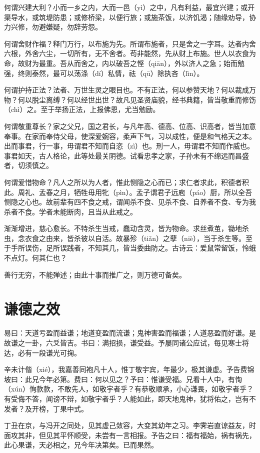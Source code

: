 \documentclass[12pt,UTF8]{ctexbook}
\begin{document}
何谓兴建大利？小而一乡之内，大而一邑（yì）之中，凡有利益，最宜兴建；或开渠导水，或筑堤防患；或修桥梁，以便行旅；或施茶饭，以济饥渴；随缘劝导，协力兴修，勿避嫌疑，勿辞劳怨。

何谓舍财作福？释门万行，以布施为先。所谓布施者，只是舍之一字耳。达者内舍六根，外舍六尘，一切所有，无不舍者。苟非能然，先从财上布施。世人以衣食为命，故财为最重。吾从而舍之，内以破吾之悭（qiān），外以济人之急；始而勉强，终则泰然，最可以荡涤（dí）私情，祛（qū）除执吝（lìn）。

何谓护持正法？法者、万世生灵之眼目也。不有正法，何以参赞天地？何以裁成万物？何以脱尘离缚？何以经世出世？故凡见圣贤庙貌，经书典籍，皆当敬重而修饬（chì）之。至于举扬正法，上报佛恩，尤当勉励。

何谓敬重尊长？家之父兄，国之君长，与凡年高、德高、位高、识高者，皆当加意奉事。在家而奉侍父母，使深爱婉容，柔声下气，习以成性，便是和气格天之本。出而事君，行一事，毋谓君不知而自恣（zì）也。刑一人，毋谓君不知而作威也。事君如天，古人格论，此等处最关阴德。试看忠孝之家，子孙未有不绵远而昌盛者，切须慎之。

何谓爱惜物命？凡人之所以为人者，惟此恻隐之心而已；求仁者求此，积德者积此。周礼、孟春之月，牺牲毋用牝（pìn）。孟子谓君子远庖（páo）厨，所以全吾恻隐之心也。故前辈有四不食之戒，谓闻杀不食、见杀不食、自养者不食、专为我杀者不食。学者未能断肉，且当从此戒之。

渐渐增进，慈心愈长。不特杀生当戒，蠢动含灵，皆为物命。求丝煮茧，锄地杀虫，念衣食之由来，皆杀彼以自活。故暴殄（tiǎn）之孽（niè），当于杀生等。至于手所误伤，足所误践者，不知其几，皆当委曲防之。古诗云：爱鼠常留饭，怜蛾不点灯。何其仁也？

善行无穷，不能殚述；由此十事而推广之，则万德可备矣。

\chapter{谦德之效}

易曰：天道亏盈而益谦；地道变盈而流谦；鬼神害盈而福谦；人道恶盈而好谦。是故谦之一卦，六爻皆吉。书曰：满招损，谦受益。予屡同诸公应试，每见寒士将达，必有一段谦光可掬。

辛未计偕（xié），我嘉善同袍凡十人，惟丁敬宇宾，年最少，极其谦虚。予告费锦坡曰：此兄今年必第。费曰：何以见之？予曰：惟谦受福。兄看十人中，有恂（xún）恂款款，不敢先人，如敬宇者乎？有恭敬顺承，小心谦畏，如敬宇者乎？有受侮不答，闻谤不辩，如敬宇者乎？人能如此，即天地鬼神，犹将佑之，岂有不发者？及开榜，丁果中式。

丁丑在京，与冯开之同处，见其虚己敛容，大变其幼年之习。李霁岩直谅益友，时面攻其非，但见其平怀顺受，未尝有一言相报。予告之曰：福有福始，祸有祸先，此心果谦，天必相之，兄今年决第矣。已而果然。
\end{document}
